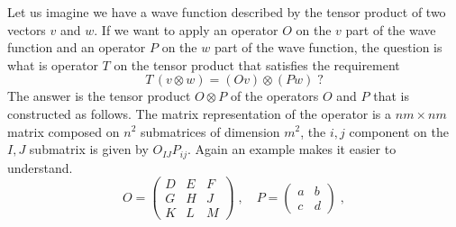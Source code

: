\documentclass[12pt]{article}
\begin{document}
Let us imagine we have a wave function described by the tensor product of two vectors $v$ and $w$. If we want to apply an operator $O$ on the $v$ part of the wave function and an operator $P$ on the $w$ part of the wave function, the question is what is operator $T$ on the tensor product that satisfies the requirement
\[T \,(v\otimes w) = (Ov)\otimes (Pw)\;?\] 
The answer is the tensor product $O\otimes P$ of the operators $O$ and $P$ that is constructed as follows. The matrix representation of the operator is a $nm\times nm$ matrix composed on $n^2$ submatrices of dimension $m^2$, the $i,j$ component on the $I,J$ submatrix is given by $O_{IJ}P_{ij}$. Again an example makes it easier to understand.
\[O=
\left(\begin{array}{ccc}
D&E&F\\
G&H&J\\
K&L&M
\end{array}\right)
\;,\quad
P=
\left(\begin{array}{cc}
a&b\\
c&d
\end{array}\right)\;,
\]
\end{document}
